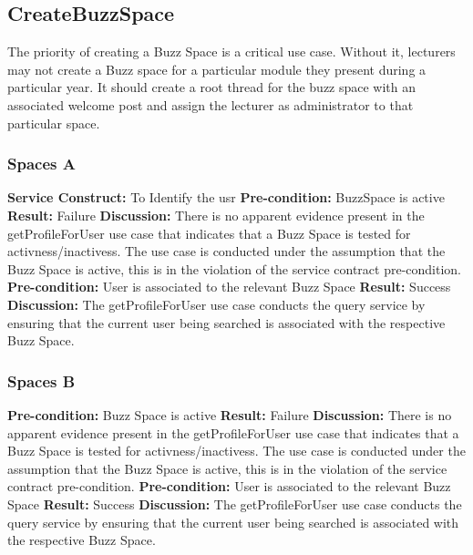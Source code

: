 
\newpage
\subsection{CreateBuzzSpace}
The priority of creating a Buzz Space is a critical use case. Without it, lecturers may not create a Buzz space for a particular module they present during a particular year. It should create a root thread for the buzz space with an associated welcome post and assign the lecturer as administrator to that particular space.

\subsubsection{Spaces A}
\textbf{Service Construct:}  To Identify the usr \newline
\textbf{Pre-condition:}  BuzzSpace is active \newline
\textbf{Result:}  Failure \newline
\textbf{Discussion:}  There is no apparent evidence present in the getProfileForUser use case that indicates that a Buzz Space is tested for activness/inactivess.
The use case is conducted under the assumption that the Buzz Space is active, this is in the violation of the service contract pre-condition. \newline \newline
\textbf{Pre-condition:}  User is associated to the relevant Buzz Space\newline
\textbf{Result:}  Success \newline
\textbf{Discussion:}  The getProfileForUser use case conducts the query service by ensuring that the current user being searched is associated with the respective Buzz Space.
\subsubsection{Spaces B}
\textbf{Pre-condition:}  Buzz Space is active \newline
\textbf{Result:}  Failure \newline
\textbf{Discussion:}  There is no apparent evidence present in the getProfileForUser use case that indicates that a Buzz Space is tested for activness/inactivess.
The use case is conducted under the assumption that the Buzz Space is active, this is in the violation of the service contract pre-condition. \newline \newline
\textbf{Pre-condition:}  User is associated to the relevant Buzz Space\newline
\textbf{Result:}  Success \newline
\textbf{Discussion:}  The getProfileForUser use case conducts the query service by ensuring that the current user being searched is associated with the respective Buzz Space.

